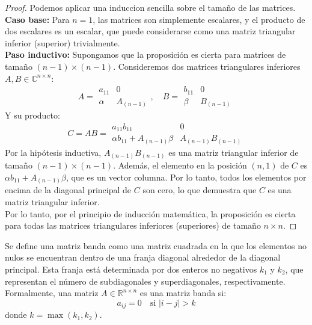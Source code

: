 \begin{proof}
    Podemos aplicar una induccion sencilla sobre el tamaño de las matrices.\\
    \textbf{Caso base:} Para \( n = 1 \), las matrices son simplemente escalares, y el producto de dos escalares es un escalar, que puede considerarse como una matriz triangular inferior (superior) trivialmente.\\
    \textbf{Paso inductivo:} Supongamos que la proposición es cierta para matrices de tamaño \( (n-1) \times (n-1) \). Consideremos dos matrices triangulares inferiores \( A, B \in \mathbb{C}^{n \times n} \):
    \[
    A =
    \begin{array}{c|c}
        a_{11} & 0 \\
        \hline
        \alpha & A_{(n-1)}
    \end{array}
    , \quad
    B =
    \begin{array}{c|c}
        b_{11} & 0 \\
        \hline
        \beta & B_{(n-1)}
    \end{array}
    \]
    Y su producto:
    \[
    C = AB =
    \begin{array}{c|c}
        a_{11} b_{11} & 0 \\
        \hline
        \alpha b_{11} + A_{(n-1)} \beta & A_{(n-1)} B_{(n-1)}
    \end{array}
    \]
    Por la hipótesis inductiva, \( A_{(n-1)} B_{(n-1)} \) es una matriz triangular inferior de tamaño \( (n-1) \times (n-1) \). Además, el elemento en la posición \( (n, 1) \) de \( C \) es \( \alpha b_{11} + A_{(n-1)} \beta \), que es un vector columna. Por lo tanto, todos los elementos por encima de la diagonal principal de \( C \) son cero, lo que demuestra que \( C \) es una matriz triangular inferior.\\
    Por lo tanto, por el principio de inducción matemática, la proposición es cierta para todas las matrices triangulares inferiores (superiores) de tamaño \( n \times n \).
\end{proof}

\begin{definición}
    Se define una matriz banda como una matriz cuadrada en la que los elementos no nulos se encuentran dentro de una franja diagonal alrededor de la diagonal principal. Esta franja está determinada por dos enteros no negativos \( k_1 \) y \( k_2 \), que representan el número de subdiagonales y superdiagonales, respectivamente. Formalmente, una matriz \( A \in \mathbb{R}^{n \times n} \) es una matriz banda si:
    \[
        a_{ij} = 0 \quad \text{si } |i - j| > k
    \]
    donde \( k = \max(k_1, k_2) \).\\
\end{definición}

